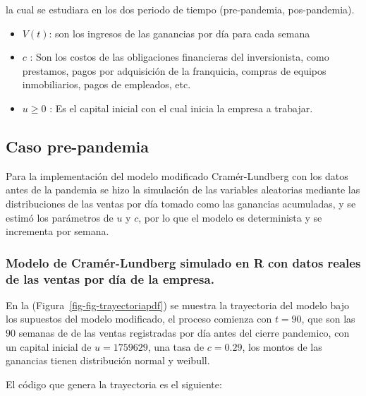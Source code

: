 \documentclass[
  us-letterpaper,
]{scrreprt}
\theoremstyle{definition}
\theoremstyle{plain}
\theoremstyle{plain}
\theoremstyle{remark}
\begin{document}
la cual se estudiara en los dos periodo de tiempo (pre-pandemia,
pos-pandemia).

\begin{itemize}
\item
  \(V(t)\): son los ingresos de las ganancias por día para cada semana
\item
  \(c\) : Son los costos de las obligaciones financieras del
  inversionista, como prestamos, pagos por adquisición de la franquicia,
  compras de equipos inmobiliarios, pagos de empleados, etc.
\item
  \(u \geq 0\) : Es el capital inicial con el cual inicia la empresa a
  trabajar.
\end{itemize}

\subsection{Caso pre-pandemia}\label{caso-pre-pandemia}

Para la implementación del modelo modificado Cramér-Lundberg con los
datos antes de la pandemia se hizo la simulación de las variables
aleatorias mediante las distribuciones de las ventas por día tomado como
las ganancias acumuladas, y se estimó los parámetros de \(u\) y \(c\),
por lo que el modelo es determinista y se incrementa por semana.

\subsubsection{Modelo de Cramér-Lundberg simulado en R con datos reales
de las ventas por día de la
empresa.}\label{modelo-de-cramuxe9r-lundberg-simulado-en-r-con-datos-reales-de-las-ventas-por-duxeda-de-la-empresa.}

En la (Figura~\ref{fig-fig-trayectoriapdf}) se muestra la trayectoria
del modelo bajo los supuestos del modelo modificado, el proceso comienza
con \(t = 90\), que son las \(90\) semanas de de las ventas registradas
por día antes del cierre pandemico, con un capital inicial de
\(u= 1759629\), una tasa de \(c= 0.29\), los montos de las ganancias
tienen distribución normal y weibull.

El código que genera la trayectoria es el siguiente:
\end{document}

